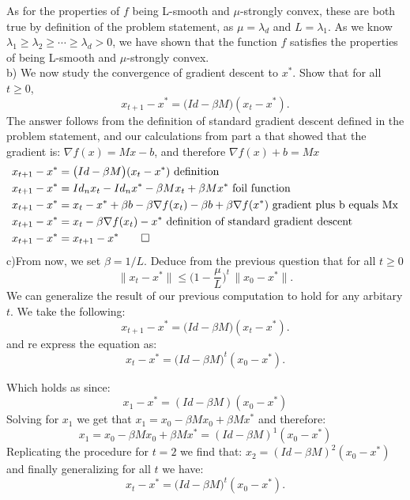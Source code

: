 \documentclass[12pt,twoside]{article}
\newcommand{\Id}{Id}
\begin{document}
As for the properties of $f$ being L-smooth and $\mu$-strongly convex, these are both true by definition of the problem statement, as $\mu = \lambda_d$ and $L= \lambda_1$. As we know $\lambda_1 \geq \lambda_2 \geq \cdots \geq \lambda_d >0$, we have shown that the function $f$ satisfies the properties of being L-smooth and $\mu$-strongly convex.\\

b) We now study the convergence of gradient descent to $x^*$. Show that for all $t \geq 0$,
			$$
			x_{t+1} - x^* = \big(\Id - \beta M \big)(x_t - x^*).
			$$
The answer follows from the definition of standard gradient descent defined in the problem statement, and our calculations from part a that showed that the gradient is: $\nabla f(x) = Mx-b$, and therefore $\nabla f(x) + b = Mx$ 
\begin{equation}
    \begin{split}
        x_{t+1} - x^* &= \big(\Id - \beta M \big)(x_t - x^*)  \text{ definition} \\
        x_{t+1} - x^* &= Id_n x_{t} - Id_nx^* - \beta Mx_{t} + \beta Mx^*  \text{ foil function} \\
        x_{t+1} - x^* &= x_{t} - x^* + \beta b - \beta\nabla f(x_t) - \beta b  + \beta\nabla f(x^*)  \text{ gradient plus b equals Mx} \\
        x_{t+1} - x^* &= x_{t} - \beta\nabla f(x_t) - x^* \text{ definition of standard gradient descent} \\
        x_{t+1} - x^* &= x_{t+1} - x^* \qed
    \end{split}
\end{equation}
c)From now, we set $\beta = 1/L$. Deduce from the previous question that for all $t \geq 0$
			$$
			\|x_t - x^* \| \leq \Big(1- \frac{\mu}{L}\Big)^{\! t} \, \|x_0 - x^*\|.
			$$
We can generalize the result of our previous computation to hold for any arbitary $t$. We take the following:
	$$
			x_{t+1} - x^* = \big(\Id - \beta M \big)(x_t - x^*).
			$$
and re express the equation as:
	$$
			x_{t} - x^* = \big(\Id - \beta M \big)^t(x_0 - x^*).
			$$
			
Which holds as since: 
$$
x_1 - x^* = (Id-\beta M)(x_0 - x^*)$$
Solving for $x_1$ we get that $x_1 = x_0 - \beta Mx_0 + \beta Mx^* $ and therefore:
$$
    x_1 = x_0 - \beta Mx_0 + \beta Mx^* = (Id-\beta M)^1 (x_0-x^*)
$$
Replicating the procedure for $t=2$ we find that: $x_2 = (Id-\beta M)^2 (x_0-x^*)$ and finally generalizing for all $t$ we have:
$$
x_{t} - x^* = \big(\Id - \beta M \big)^t(x_0 - x^*).
$$
\end{document}
